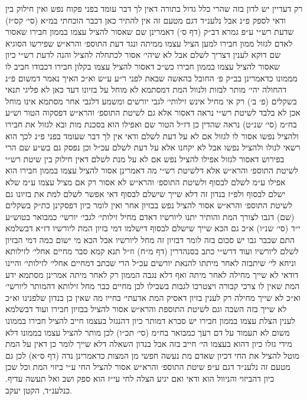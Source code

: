 \documentclass[12pt, openany]{book}
\begin{document}
\begin{multicols}{2}
רק דעדיין יש לדון בזה שהרי כלל גדול בתורה דאין לך דבר עומד בפני פקוח נפש ואין חילוק בין ודאי לספק פ״נ אבל נלענ״ד דגם מטעם זה אין להתיר כאן דכבר הוכחתי במ״א (סי׳ קס״ז) שדעת רש״י ע״פ גמרא דב״ק (דף ס׳) דאמרינן שם שאסור להציל עצמו בממון חבירו שאסור לאדם לגזול ממון חבירו למען הציל עצמו ממיתה ונגד דעת התוספ׳ והרא״ש שפירשו הסוגיא שם דוקא לענין דצריך לשלם אבל לא שיהי׳ אסור לכתחלה להציל והנה לדעת רש״י כיון שאסור להציל עצמו בממון חבירו כש״כ דאסור להציל עצמו בקלון חבירו דכבודו חביב לו מממונו כדאמרינן בב״ק פ׳ החובל בהאשה שבאת לפני ר״ע ע״ש וא״כ האיך נאמר דמשום פ״נ דהחולה יהי׳ מותר לבזות ולנוול המת דמסתמא לא מוחל על בזיונו דעד כאן לא פליגי תנאי בשקלים (פ׳ ב׳) רק אי מחיל אינש זילותי׳ לגבי יורשים ומשמע דלגבי אחר מסתמא אינו מוחל אכן לא בלבד לשיטת רש״י נראה דאסור אלא גם לשיטת התוספ׳ והרא״ש דפסקוה הטור וש״ע בח״מ (סי׳ שנ״ט) נראה שהדין כן דז״ל הטור שם ואפילו הוא בסכנת מות ובא לגזול את חבירו ולהציל נפשו אסור לו לגזול אם לא על דעת לשלם ודאי אין לך דבר שעומד בפני פ״נ לכך הוא רשאי לנולו ולהציל נפשו אבל לא יקחנו אלא על דעת לשלם עכ״ל וכן נפסק גם בש״ע שם הרי בפירוש דאסור לגזול אפילו להציל נפש אם לא על מנת לשלם דאין חילוק בין שיטת רש״י לשיטת התוספ׳ והרא״ש אלא דלשיטת רש״י מה דאמרינן אסור להציל עצמו בממון חבירו הוא אפילו ע״מ לשלם לבסוף ולשיטת התוספ׳ והרא״ש לא אסור רק אם מציל עצמו ע״מ שלא ישלם לבסוף ולפ״ז בנדון זה דלא שייך שישלם לבסוף דאי אפשר לשלם למת את בזיונו גם לשיטת התוספ׳ והרא״ש אסור להציל נפש בבזיון אחר ואין לומר כיון דפסקינן כת״ק בשקלים (שם) דגבו לצורך המת והותיר יתנו ליורשיו דאדם מחיל זילותי׳ לגבי׳ יורשי׳ כמבואר בטוש״ע י״ד (סי׳ שנ״ו) א״כ גם הכא שייך שישלם לבסוף דישלמו דמי בזיון המת ליורשיו דז״א דבשלמא התם שכבר גבו יש סכום בזה לומר דבזיון זה מחל ליורשיו אבל הכא מי ישום כמה דמי הבזיון לשלם ליורשיו ועוד דרש״י כתב בסנהדרין (דף מ״ח) וז״ל תנא קמא סבר מחיים אחלי׳ לזילותא וניחא לי׳ שיתבזה לאחר מיתתו להנאת יורשים עכ״ל הרי שכתב דמחיים אחלי׳ לזילותי׳ והיינו דודאי לא שייך מחילה לאחר מיתה ואף דלא נגבה הממון רק לאחר מיתה אמרינן מסתמא ידע המת שאין לו צרכי קבורה ויצטרכו לגבות בשבילו לכן מחיים כבר מחל זילותא דהמותר ליורשי׳ וא״כ לא שייך מחילה רק לענין בזיון דאסיק המת אדעתי׳ בחייו מה שאין כן בנדון שלפנינו וא״כ לא שייך בזה השבה וגם לשיטת התוספת והרא״ש אסור להציל בבזיון חבירו ועוד דבשלמא לענין הצלת עצמו בממון חבירו יש סברא דמותר כיון דהנגזל בעצמו חייב להציל חבירו בממונו משום לא תעמוד על דם רעך כמבואר בח״מ (סי׳ תכ״ו) לכן מותר להציל עצמו בממונו דלא מידי גזלו כיון דהוא בעצמו הי׳ חייב בזה אבל בנדון השאלה דלא שייך לומר כן דאין על המת מוטל להציל את החי דכיון שאדם מת נעשה חפשי מן המצות כדאמרינן נדה (דף ס״א) לכן גם מטעם זה נלענ״ד דגם ע״פ שיטת התוספ׳ והרא״ש אסור להציל החי ע״י ביזוי המת וכל שכן כיון דהביזוי והניוול הוא ודאי ואם יגיע הצלה לחי עי״ז הוא ספק ושב ואל תעשה עדיף. כנלענ״ד, הקטן יעקב.\\\vspace{0pt}

\end{multicols}\newpage
\end{document}
